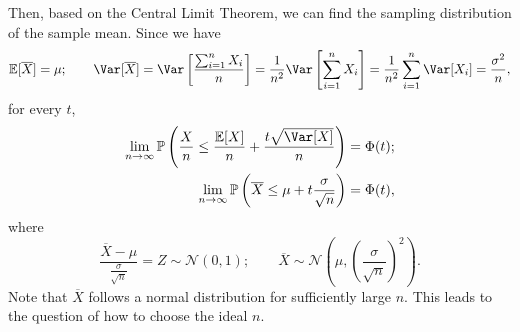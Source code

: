 Then, based on the Central Limit Theorem, we can find the sampling distribution of the sample mean. Since we have 
\[
  \mathbb{E}[\overline{X}] = \mu ;\quad\quad \Var[\overline{X}] = \Var\left[\dfrac{\sum_{i = 1}^n X_i}{n}\right] = \dfrac{1}{n^2} \Var\left[\sum_{i = 1}^n X_i\right] = \dfrac{1}{n^2}\sum_{i = 1}^n \Var[X_i] = \dfrac{\sigma^2}{n}, 
\]
for every \(t\), 
\[
\begin{aligned}
  \lim_{n \to \infty} \mathbb{P}\left(\dfrac{X}{n} \leq \dfrac{\mathbb{E}[X]}{n} + \dfrac{t\sqrt{\Var[X]}}{n}\right) &= \Phi(t); \\
  \lim_{n \to \infty} \mathbb{P}\left(\overline{X} \leq \mu + t\dfrac{\sigma}{\sqrt{n}}\right) &= \Phi(t), 
\end{aligned}
\]
where 
\[
  \dfrac{\overline{X} - \mu}{\frac{\sigma}{\sqrt{n}}} = Z \sim \mathcal{N}(0, 1) ; \quad\quad \overline{X} \sim \mathcal{N} \left(\mu, \left(\dfrac{\sigma}{\sqrt{n}}\right)^2\right).
\]
Note that \(\overline{X}\) follows a normal distribution for sufficiently large \(n\). This leads to the question of how to choose the ideal \(n\). 

